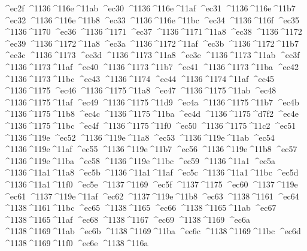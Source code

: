 \checkit ^^^^ec2f ^^^^1136^^^^116e^^^^11ab
\checkit ^^^^ec30 ^^^^1136^^^^116e^^^^11af
\checkit ^^^^ec31 ^^^^1136^^^^116e^^^^11b7
\checkit ^^^^ec32 ^^^^1136^^^^116e^^^^11b8
\checkit ^^^^ec33 ^^^^1136^^^^116e^^^^11bc
\checkit ^^^^ec34 ^^^^1136^^^^116f
\checkit ^^^^ec35 ^^^^1136^^^^1170
\checkit ^^^^ec36 ^^^^1136^^^^1171
\checkit ^^^^ec37 ^^^^1136^^^^1171^^^^11a8
\checkit ^^^^ec38 ^^^^1136^^^^1172
\checkit ^^^^ec39 ^^^^1136^^^^1172^^^^11a8
\checkit ^^^^ec3a ^^^^1136^^^^1172^^^^11af
\checkit ^^^^ec3b ^^^^1136^^^^1172^^^^11b7
\checkit ^^^^ec3c ^^^^1136^^^^1173
\checkit ^^^^ec3d ^^^^1136^^^^1173^^^^11a8
\checkit ^^^^ec3e ^^^^1136^^^^1173^^^^11ab
\checkit ^^^^ec3f ^^^^1136^^^^1173^^^^11af
\checkit ^^^^ec40 ^^^^1136^^^^1173^^^^11b7
\checkit ^^^^ec41 ^^^^1136^^^^1173^^^^11ba
\checkit ^^^^ec42 ^^^^1136^^^^1173^^^^11bc
\checkit ^^^^ec43 ^^^^1136^^^^1174
\checkit ^^^^ec44 ^^^^1136^^^^1174^^^^11af
\checkit ^^^^ec45 ^^^^1136^^^^1175
\checkit ^^^^ec46 ^^^^1136^^^^1175^^^^11a8
\checkit ^^^^ec47 ^^^^1136^^^^1175^^^^11ab
\checkit ^^^^ec48 ^^^^1136^^^^1175^^^^11af
\checkit ^^^^ec49 ^^^^1136^^^^1175^^^^11d9
\checkit ^^^^ec4a ^^^^1136^^^^1175^^^^11b7
\checkit ^^^^ec4b ^^^^1136^^^^1175^^^^11b8
\checkit ^^^^ec4c ^^^^1136^^^^1175^^^^11ba
\checkit ^^^^ec4d ^^^^1136^^^^1175^^^^d7f2
\checkit ^^^^ec4e ^^^^1136^^^^1175^^^^11bc
\checkit ^^^^ec4f ^^^^1136^^^^1175^^^^11f0
\checkit ^^^^ec50 ^^^^1136^^^^1175^^^^11c2
\checkit ^^^^ec51 ^^^^1136^^^^119e
\checkit ^^^^ec52 ^^^^1136^^^^119e^^^^11a8
\checkit ^^^^ec53 ^^^^1136^^^^119e^^^^11ab
\checkit ^^^^ec54 ^^^^1136^^^^119e^^^^11af
\checkit ^^^^ec55 ^^^^1136^^^^119e^^^^11b7
\checkit ^^^^ec56 ^^^^1136^^^^119e^^^^11b8
\checkit ^^^^ec57 ^^^^1136^^^^119e^^^^11ba
\checkit ^^^^ec58 ^^^^1136^^^^119e^^^^11bc
\checkit ^^^^ec59 ^^^^1136^^^^11a1
\checkit ^^^^ec5a ^^^^1136^^^^11a1^^^^11a8
\checkit ^^^^ec5b ^^^^1136^^^^11a1^^^^11af
\checkit ^^^^ec5c ^^^^1136^^^^11a1^^^^11bc
\checkit ^^^^ec5d ^^^^1136^^^^11a1^^^^11f0
\checkit ^^^^ec5e ^^^^1137^^^^1169
\checkit ^^^^ec5f ^^^^1137^^^^1175
\checkit ^^^^ec60 ^^^^1137^^^^119e
\checkit ^^^^ec61 ^^^^1137^^^^119e^^^^11af
\checkit ^^^^ec62 ^^^^1137^^^^119e^^^^11b8
\checkit ^^^^ec63 ^^^^1138^^^^1161
\checkit ^^^^ec64 ^^^^1138^^^^1161^^^^11bc
\checkit ^^^^ec65 ^^^^1138^^^^1165
\checkit ^^^^ec66 ^^^^1138^^^^1165^^^^11ab
\checkit ^^^^ec67 ^^^^1138^^^^1165^^^^11af
\checkit ^^^^ec68 ^^^^1138^^^^1167
\checkit ^^^^ec69 ^^^^1138^^^^1169
\checkit ^^^^ec6a ^^^^1138^^^^1169^^^^11ab
\checkit ^^^^ec6b ^^^^1138^^^^1169^^^^11ba
\checkit ^^^^ec6c ^^^^1138^^^^1169^^^^11bc
\checkit ^^^^ec6d ^^^^1138^^^^1169^^^^11f0
\checkit ^^^^ec6e ^^^^1138^^^^116a
